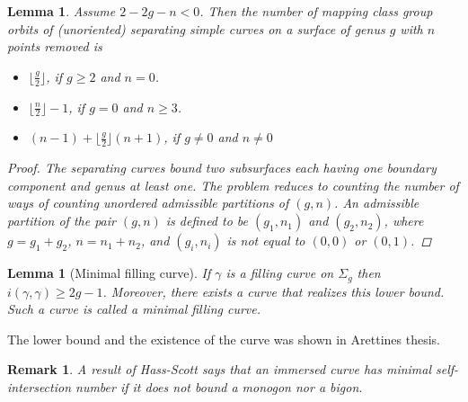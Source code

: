 \documentclass[12pt]{amsart}
\numberwithin{equation}{section}
\theoremstyle{plain}
\newtheorem{lem}[thm]{Lemma}
\newtheorem{rem}[thm]{Remark}
\begin{document}
 \begin{lem}
 Assume  $2-2g-n < 0$. Then the number of  mapping class group orbits of  (unoriented) separating simple curves on 
   a surface of genus $g$ with $n$ points removed is 
   \begin{itemize}
 \item $\lfloor \frac{g}{2} \rfloor$, if $g \geq 2$ and $n=0$. 
 \item $\lfloor \frac{n}{2}\rfloor -1$, if $g=0$ and $n\geq 3$.
 \item  $(n-1) +\lfloor \frac{g}{2}\rfloor (n+1)$,  if $g\neq 0$ and $n \neq 0$
 \end{itemize}
 
 \begin{proof} 
 
  The separating curves bound two subsurfaces each having one boundary component and genus at least one. The problem reduces to counting the number of ways of counting unordered admissible  partitions of $(g,n)$.   An admissible  partition of the pair $(g,n)$ is defined  to be  
 $(g_{1}, n_{1})$  and $(g_{2}, n_{2})$, where 
 $g=g_{1}+g_{2}$, $n=n_{1}+n_{2}$, and $(g_{i},n_{i})$ is not equal to 
 $(0,0)$ or $(0,1)$. 
 \end{proof}
 \end{lem}
 \vskip10pt
 
 
 \begin{lem}[Minimal filling curve] \label{lem: minimalfillingcurve}
  If $\gamma$ is a filling curve on $\Sigma_{g}$ then 
  $i(\gamma,\gamma) \geq 2g-1 $. Moreover, there exists a curve that realizes this lower bound. Such a curve is called a minimal filling curve. 
 \end{lem} 
 
 The lower bound and the existence of the curve   was shown in Arettines thesis\cite{arettines2015geometry}.



 

 

 
 \begin{rem} A result of Hass-Scott \cite{hass1985intersections} says that an immersed curve has minimal self-intersection number if it does not bound a monogon nor a bigon. 
 \end{rem}
 
\end{document}
